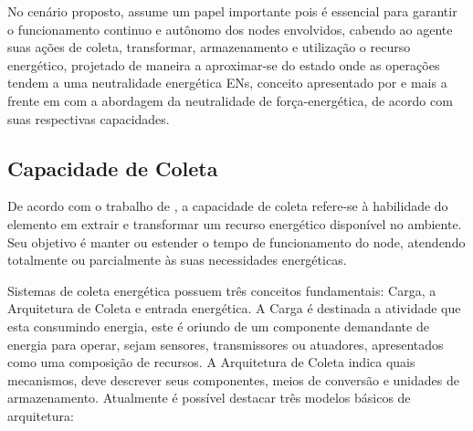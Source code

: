 No cenário proposto, assume um papel importante pois é essencial para garantir o funcionamento continuo e autônomo dos nodes envolvidos, cabendo ao agente suas ações de coleta, transformar, armazenamento e utilização o recurso energético, projetado de maneira a aproximar-se do estado onde as operações tendem a uma neutralidade energética \acfp{EN}, conceito apresentado por \cite{kansal_power_2007} e mais a frente em \cite{merrett_energy-driven_2017} com a abordagem da neutralidade de força-energética, de acordo com suas respectivas capacidades.







\subsection{Capacidade de Coleta}
De acordo com o trabalho de \cite{sudevalayam_energy_2011}, a capacidade de coleta refere-se à habilidade do elemento em extrair e transformar um recurso energético disponível no ambiente. Seu objetivo é manter ou estender o tempo de funcionamento do node, atendendo totalmente ou parcialmente às suas necessidades energéticas.

Sistemas de coleta energética possuem três conceitos fundamentais: Carga, a Arquitetura de Coleta e entrada energética. A Carga é destinada a atividade que esta consumindo energia, este é oriundo de um componente demandante de energia para operar, sejam sensores, transmissores ou  atuadores, apresentados como uma composição de recursos. A Arquitetura de Coleta indica quais mecanismos, deve descrever seus componentes, meios de conversão e unidades de armazenamento. Atualmente é possível destacar três modelos básicos de arquitetura:

